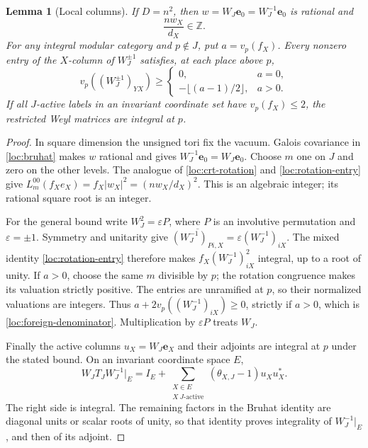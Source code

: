 \documentclass[11pt,a4paper]{article}
\numberwithin{equation}{section}
\newtheorem{lemma}[theorem]{Lemma}
\begin{document}
\begin{lemma}[Local columns]\label{loc:columns}
If $D=n^2$, then $w=W_J\mathbf e_0=W_J^{-1}\mathbf e_0$ is rational
and
\begin{equation}\label{loc:column-integer}
                     \frac{n w_X}{d_X}\in\mathbb Z.
\end{equation}
For any integral modular category and $p\notin J$, put
$a=v_p(f_X)$. Every nonzero entry of the $X$-column of $W_J^{\pm1}$
satisfies, at each place above $p$,
\begin{equation}\label{loc:foreign-denominator}
 v_p((W_J^{\pm1})_{YX})\ge
 \begin{cases}0,&a=0,\\-\lfloor(a-1)/2\rfloor,&a>0.
 \end{cases}
\end{equation}
If all $J$-active labels in an invariant coordinate set have
$v_p(f_X)\le2$, the restricted Weyl matrices are integral at $p$.
\end{lemma}
\begin{proof}
In square dimension the unsigned tori fix the vacuum. Galois
covariance in \eqref{loc:bruhat} makes $w$ rational and gives
$W_J^{-1}\mathbf e_0=W_J\mathbf e_0$. Choose $m$ one on $J$ and
zero on the other levels. The analogue of
\eqref{loc:crt-rotation} and \eqref{loc:rotation-entry} give
$L_m^{00}(f_Xe_X)=f_X|w_X|^2=(nw_X/d_X)^2$.
This is an algebraic integer; its rational square root is an integer.

For the general bound write $W_J^2=\varepsilon P$, where $P$ is
an involutive permutation and $\varepsilon=\pm1$. Symmetry and
unitarity give
$\overline{(W_J^{-1})_{Pi,X}}=\varepsilon(W_J^{-1})_{iX}$.
The mixed identity \eqref{loc:rotation-entry} therefore makes
$f_X(W_J^{-1})_{iX}^2$ integral, up to a root of unity. If $a>0$,
choose the same $m$ divisible by $p$; the rotation congruence makes
its valuation strictly positive. The entries are unramified at $p$,
so their normalized valuations are integers. Thus
$a+2v_p((W_J^{-1})_{iX})\ge0$, strictly if $a>0$, which is
\eqref{loc:foreign-denominator}. Multiplication by $\varepsilon P$
treats $W_J$.

Finally the active columns $u_X=W_J\mathbf e_X$ and their adjoints
are integral at $p$ under the stated bound. On an invariant coordinate
space $E$,
\[
 W_JT_JW_J^{-1}|_E
   =I_E+\sum_{\substack{X\in E\\X\ J\text{-active}}}
                      (\theta_{X,J}-1)u_Xu_X^*.
\]
The right side is integral. The remaining factors in the Bruhat
identity are diagonal units or scalar roots of unity, so that
identity proves integrality of $W_J^{-1}|_E$, and then of its adjoint.
\end{proof}
\end{document}
